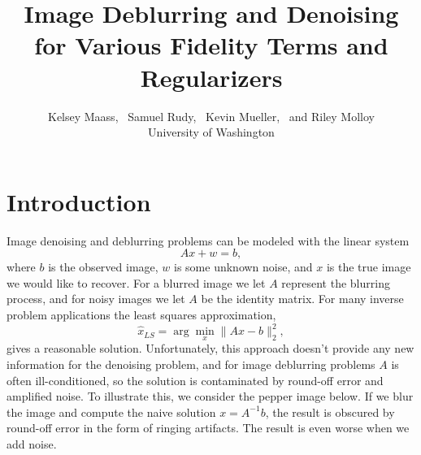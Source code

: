 \documentclass[10pt,a4paper]{article}
\begin{document}
\title{Image Deblurring and Denoising for Various Fidelity Terms and Regularizers}
\author{
Kelsey Maass, ~Samuel Rudy, ~Kevin Mueller, ~and Riley Molloy\\
University of Washington\\
}

\maketitle

\section{Introduction}

Image denoising and deblurring problems can be modeled with the linear system
\begin{equation}
Ax + w = b,
\end{equation}
where $b$ is the observed image, $w$ is some unknown noise, and $x$ is the true image we would like to recover. For a blurred image we let $A$ represent the blurring process, and for noisy images we let $A$ be the identity matrix. For many inverse problem applications the least squares approximation, 
\begin{equation}
\hat{x}_{LS} = \arg\min_x \| Ax - b \|_2^2 ,
\end{equation}
gives a reasonable solution. Unfortunately, this approach doesn't provide any new information for the denoising problem, and for image deblurring problems $A$ is often ill-conditioned, so the solution is contaminated by round-off error and amplified noise. To illustrate this, we consider the pepper image below. If we blur the image and compute the naive solution $x = A^{-1}b$, the result is obscured by round-off error in the form of ringing artifacts. The result is even worse when we add noise.
\end{document}

